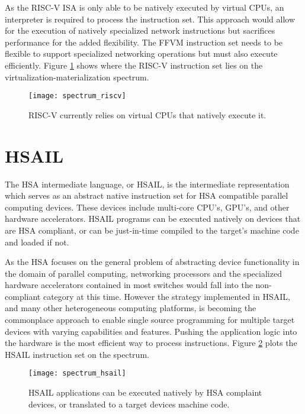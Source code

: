 As the RISC-V ISA is only able to be natively executed by virtual CPUs, an
interpreter is required to process the instruction set. This approach would
allow for the execution of natively specialized network instructions but
sacrifices performance for the added flexibility. The FFVM instruction set
needs to be flexible to support specialized networking operations but must also
execute efficiently. Figure \ref{spectrum_riscv} shows where the RISC-V
instruction set lies on the virtualization-materialization spectrum.

\begin{figure}[h!]
  \centering
  \texttt{[image: spectrum\_riscv]}
  \caption{RISC-V currently relies on virtual CPUs that natively execute it.}
  \label{spectrum_riscv}
\end{figure}

\section{HSAIL}
\label{insn:hsail}
The HSA intermediate language, or HSAIL, is the intermediate representation
which serves as an abstract native instruction set for HSA compatible parallel
computing devices. These devices include multi-core CPU's, GPU's, and other
hardware accelerators. HSAIL programs can be executed natively on devices that
are HSA compliant, or can be just-in-time compiled to the target's machine code
and loaded if not.

As the HSA focuses on the general problem of abstracting device functionality
in the domain of parallel computing, networking processors and the specialized
hardware accelerators contained in most switches would fall into the
non-compliant category at this time. However the strategy implemented in HSAIL,
and many other heterogeneous computing platforms, is becoming the commonplace
approach to enable single source programming for multiple target devices with
varying capabilities and features. Pushing the application logic into the
hardware is the most efficient way to process instructions. Figure
\ref{spectrum_hsail} plots the HSAIL instruction set on the spectrum.

\begin{figure}[h!]
  \centering
  \texttt{[image: spectrum\_hsail]}
  \caption{HSAIL applications can be executed natively by HSA complaint devices,
  or translated to a target devices machine code.}
  \label{spectrum_hsail}
\end{figure}

